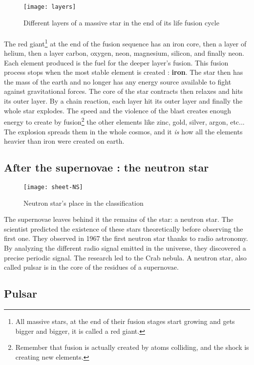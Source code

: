 \documentclass[a4paper, 11pt]{article} %
\begin{document}
\begin{figure}[h]
\centering
\texttt{[image: layers]}
\caption{Different layers of a massive star in the end of its life fusion cycle}
\end{figure}

\paragraph*{}
The red giant\footnote{All massive stars, at the end of their fusion stages start growing and gets bigger and bigger, it is called a red giant.} at the end of the fusion sequence has an iron core, then a layer of helium, then a layer carbon, oxygen, neon,  magnesium, silicon, and finally neon. Each element produced is the fuel for the deeper layer's  fusion. This fusion process stops when the most stable element is created : \textbf{iron}. The star then has the mass of the earth and no longer has any energy source available to fight against gravitational forces. The core of the star contracts then relaxes and hits its outer layer. By a chain reaction, each layer hit its outer layer and finally the whole star explodes. The speed and the violence of the blast creates enough energy to create by fusion\footnote{Remember that fusion is actually created by atoms colliding, and the shock is creating new elements.} the other elements like zinc, gold, silver, argon, etc... The explosion spreads them in the whole cosmos, and it \textit{is} how all the elements heavier than iron were created on earth.

\subsection{After the supernovae : the neutron star}

\begin{figure}[h]
\centering
\texttt{[image: sheet-NS]}
\caption{Neutron star's place in the classification}
\end{figure}
The supernovae leaves behind it the remains of the star: a neutron star. The scientist predicted the existence of these stars theoretically before observing the first one. They observed in 1967 the first neutron star thanks to radio astronomy. By analyzing the different radio signal emitted in the universe, they discovered a precise periodic signal. The research led to the Crab nebula. A neutron star, also called pulsar is in the core of the residues of a supernovae.

\subsection{Pulsar}
\end{document}
